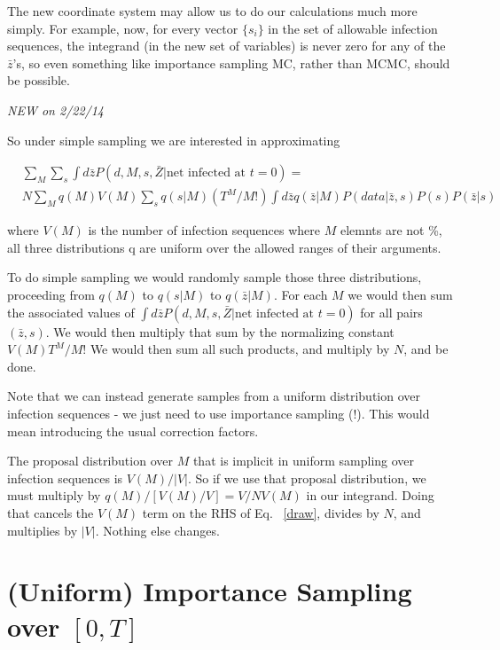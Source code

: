 \documentclass{article}
\begin{document}
        The new coordinate system may allow us to do our calculations much more simply. For
        example, now, for every vector $\{s_i\}$ in the set of allowable infection sequences, the 
        integrand (in the new set of variables) is never zero for any of the
        $\bar{z}$'s,  so even something like importance sampling MC, rather than 
        MCMC, should be possible. 

        \emph{NEW on 2/22/14}

        So under simple sampling we are interested in approximating

\begin{align}
& \sum_{M}  \sum_{s} \int d\bar{z} P(d, M, s, \bar{Z} | \text{net infected at } t  = 0)  =\\
& N \sum_M q(M)  V(M) \sum_{s} q(s | M)   (T^M/M!)  \int d\bar{z} q(\bar{z} | M) P(data | \bar{z},s)P(s)P(\bar{z} |s) 
\label{draw}
\end{align}

        where $V(M)$ is the number of infection sequences where  $M$ elemnts are not \%, 
        all three distributions q are uniform over the allowed ranges of their arguments.

        To do simple sampling we would randomly sample those three distributions,
        proceeding from $q(M)$ to $q(s | M)$ to $q(\bar{z} | M)$. For each $M$ we would
        then sum the associated values of $\int d\bar{z} P(d, M, s, \bar{Z} | \text{net infected at } t  = 0)$ 
        for all pairs $(\bar{z}, s)$. We would then multiply that sum by the normalizing constant $V(M)T^M / M!$
        We would then sum all such products, and multiply by $N$, and be done.

        Note that we can instead generate samples from a uniform distribution over
        infection sequences   -  we just need to use importance sampling (!). This would mean
        introducing the usual correction factors.
 
        The proposal distribution over $M$ that is implicit in uniform sampling over infection sequences is
        $V(M) / |V|$. So if we use that proposal distribution, we must multiply by
        $q(M) / [V(M) / V] = V / NV(M)$ in our integrand. Doing that cancels the $V(M)$
        term on the RHS of Eq. ~\ref{draw}, divides by $N$, and multiplies by $|V|$. Nothing else changes.


\pagebreak

\section{(Uniform) Importance Sampling over $[0, T]$ }
\end{document}
